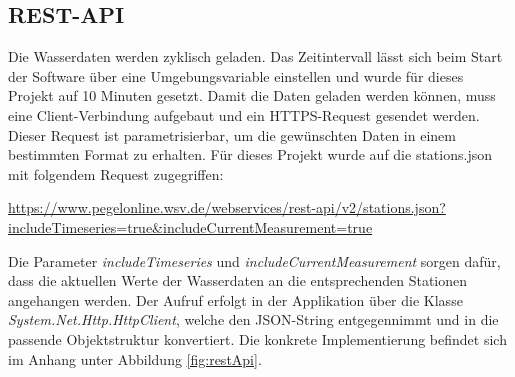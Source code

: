 \subsection{REST-API}
\label{sec-rest-api}
Die Wasserdaten werden zyklisch geladen. Das Zeitintervall lässt sich beim Start der Software über eine Umgebungsvariable einstellen und wurde für dieses Projekt auf 10 Minuten gesetzt. Damit die Daten geladen werden können, 
muss eine Client-Verbindung aufgebaut und ein HTTPS-Request gesendet werden. 
Dieser Request ist parametrisierbar, um die gewünschten Daten in einem bestimmten Format zu erhalten. Für dieses
Projekt wurde auf die stations.json mit folgendem Request zugegriffen: \\
\begin{center}
    \href{https://www.pegelonline.wsv.de/webservices/rest-api/v2/stations.json?includeTimeseries=true&includeCurrentMeasurement=true}{https://www.pegelonline.wsv.de/webservices/rest-api/v2/stations.json?\\includeTimeseries=true\&includeCurrentMeasurement=true}  
\end{center}\vspace{0.5cm}
Die Parameter \textit{includeTimeseries} und \textit{includeCurrentMeasurement} sorgen dafür, dass die aktuellen Werte der Wasserdaten an die entsprechenden Stationen
angehangen werden. Der Aufruf erfolgt in der Applikation über die Klasse \textit{System.Net.Http.HttpClient}, welche den JSON-String entgegennimmt und in die
passende Objektstruktur konvertiert. Die konkrete Implementierung befindet sich im Anhang unter Abbildung \ref{fig:restApi}.

